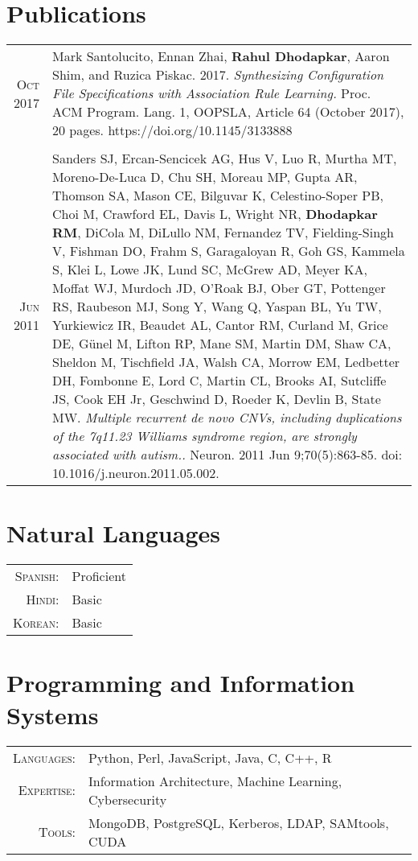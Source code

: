 \documentclass[a4paper,10pt]{article}
\begin{document}
\section{Publications}
\begin{tabular}{rp{11cm}}
 \textsc{Oct} 2017 & Mark Santolucito, Ennan Zhai, {\bf Rahul Dhodapkar}, Aaron Shim, and Ruzica Piskac. 2017. {\it Synthesizing Configuration
File Specifications with Association Rule Learning.} Proc. ACM Program. Lang. 1, OOPSLA, Article 64
(October 2017), 20 pages. https://doi.org/10.1145/3133888 \\
\multicolumn{2}{c}{} \\
 \textsc{Jun} 2011 & Sanders SJ, Ercan-Sencicek AG, Hus V, Luo R, Murtha MT, Moreno-De-Luca D, Chu SH, Moreau MP, Gupta AR, Thomson SA, Mason CE, Bilguvar K, Celestino-Soper PB, Choi M, Crawford EL, Davis L, Wright NR, {\bf Dhodapkar RM}, DiCola M, DiLullo NM, Fernandez TV, Fielding-Singh V, Fishman DO, Frahm S, Garagaloyan R, Goh GS, Kammela S, Klei L, Lowe JK, Lund SC, McGrew AD, Meyer KA, Moffat WJ, Murdoch JD, O'Roak BJ, Ober GT, Pottenger RS, Raubeson MJ, Song Y, Wang Q, Yaspan BL, Yu TW, Yurkiewicz IR, Beaudet AL, Cantor RM, Curland M, Grice DE, Günel M, Lifton RP, Mane SM, Martin DM, Shaw CA, Sheldon M, Tischfield JA, Walsh CA, Morrow EM, Ledbetter DH, Fombonne E, Lord C, Martin CL, Brooks AI, Sutcliffe JS, Cook EH Jr, Geschwind D, Roeder K, Devlin B, State MW. {\it Multiple recurrent de novo CNVs, including duplications of the 7q11.23 Williams syndrome region, are strongly associated with autism..} Neuron. 2011 Jun 9;70(5):863-85. doi: 10.1016/j.neuron.2011.05.002. 
\end{tabular}

\section{Natural Languages}
\begin{tabular}{rl}
\textsc{Spanish:}&Proficient\\
\textsc{Hindi:}&Basic\\
\textsc{Korean:}&Basic\\
\end{tabular}

\section{Programming and Information Systems}
\begin{tabular}{rl}
\textsc{Languages:}&Python, Perl, JavaScript, Java, C, C++, R\\
\textsc{Expertise:}&Information Architecture, Machine Learning, Cybersecurity\\
\textsc{Tools:}&MongoDB, PostgreSQL, Kerberos, LDAP, SAMtools, CUDA
\end{tabular}
\end{document}
